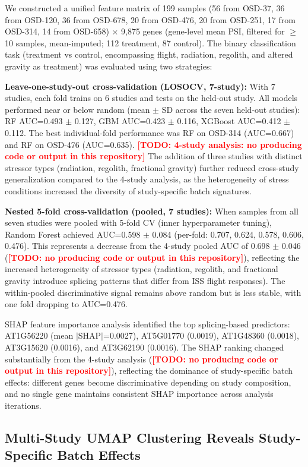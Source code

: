 \documentclass[12pt,a4paper]{article}
\newcommand{\TODO}[1]{\textcolor{red}{\textbf{[TODO: #1]}}}
\begin{document}
We constructed a unified feature matrix of 199 samples (56 from OSD-37, 36 from OSD-120, 36 from OSD-678, 20 from OSD-476, 20 from OSD-251, 17 from OSD-314, 14 from OSD-658) $\times$ 9,875 genes (gene-level mean PSI, filtered for $\geq$10 samples, mean-imputed; 112 treatment, 87 control). The binary classification task (treatment vs control, encompassing flight, radiation, regolith, and altered gravity as treatment) was evaluated using two strategies:

\textbf{Leave-one-study-out cross-validation (LOSOCV, 7-study):} With 7 studies, each fold trains on 6 studies and tests on the held-out study. All models performed near or below random (mean $\pm$ SD across the seven held-out studies): RF AUC=0.493 $\pm$ 0.127, GBM AUC=0.423 $\pm$ 0.116, XGBoost AUC=0.412 $\pm$ 0.112. The best individual-fold performance was RF on OSD-314 (AUC=0.667) and RF on OSD-476 (AUC=0.635). \TODO{4-study analysis: no producing code or output in this repository} The addition of three studies with distinct stressor types (radiation, regolith, fractional gravity) further reduced cross-study generalization compared to the 4-study analysis, as the heterogeneity of stress conditions increased the diversity of study-specific batch signatures.

\textbf{Nested 5-fold cross-validation (pooled, 7 studies):} When samples from all seven studies were pooled with 5-fold CV (inner hyperparameter tuning), Random Forest achieved AUC=0.598 $\pm$ 0.084 (per-fold: 0.707, 0.624, 0.578, 0.606, 0.476). This represents a decrease from the 4-study pooled AUC of 0.698 $\pm$ 0.046 (\TODO{no producing code or output in this repository}), reflecting the increased heterogeneity of stressor types (radiation, regolith, and fractional gravity introduce splicing patterns that differ from ISS flight responses). The within-pooled discriminative signal remains above random but is less stable, with one fold dropping to AUC=0.476.

SHAP feature importance analysis identified the top splicing-based predictors: AT1G56220 (mean $|$SHAP$|$=0.0027), AT5G01770 (0.0019), AT1G48360 (0.0018), AT3G15620 (0.0016), and AT3G62190 (0.0016). The SHAP ranking changed substantially from the 4-study analysis (\TODO{no producing code or output in this repository}), reflecting the dominance of study-specific batch effects: different genes become discriminative depending on study composition, and no single gene maintains consistent SHAP importance across analysis iterations.

\subsection{Multi-Study UMAP Clustering Reveals Study-Specific Batch Effects}
\end{document}
